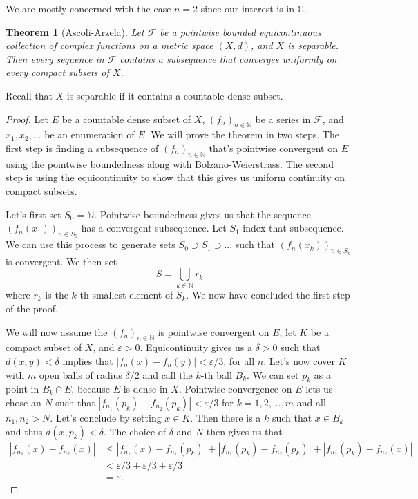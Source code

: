 \documentclass[a4paper,12pt,twoside,BCOR=10mm]{scrbook}
\newtheorem{theorem}{Theorem}[section]
\theoremstyle{definition}
\theoremstyle{definition}
\theoremstyle{definition}
\begin{document}
We are mostly concerned with the case $n = 2$ since our interest is in $\mathbb{C}$.
\begin{theorem}[Ascoli-Arzela]
Let $\mathcal{F}$ be a pointwise bounded equicontinuous collection of complex functions on a metric space $(X, d)$, and $X$ is separable.
Then every sequence in $\mathcal{F}$ contains a subsequence that converges uniformly on every compact subsets of $X$.
\end{theorem}
\label{index23}
Recall that $X$ is separable if it contains a countable dense subset.
\begin{proof}
Let $E$ be a countable dense subset of $X$,
	$(f_n)_{n \in \mathbb{N}}$ be a series in $\mathcal{F}$,
	and $x_1, x_2, ...$ be an enumeration of $E$.
We will prove the theorem in two steps.
The first step is finding a subsequence of $(f_n)_{n \in \mathbb{N}}$ that's pointwise convergent on $E$ using the pointwise boundedness along with Bolzano-Weierstrass.
The second step is using the equicontinuity to show that this gives us uniform continuity on compact subsets.

Let's first set $S_0 = \mathbb{N}$.
Pointwise boundedness gives us that the sequence $(f_n(x_1))_{n \in S_0}$ has a convergent subsequence.
Let $S_1$ index that subsequence.
We can use this process to generate sets $S_0 \supset S_1 \supset ...$ such that $(f_n(x_k))_{n \in S_k}$ is convergent.
We then set
\[
	S = \bigcup_{k \in \mathbb{N}} r_k
\]
where $r_k$ is the $k$-th smallest element of $S_k$.
We now have concluded the first step of the proof.

We will now assume the $(f_n)_{n \in \mathbb{N}}$ is pointwise convergent on $E$,
	let $K$ be a compact subset of $X$, and
	$\varepsilon > 0$.
Equicontinuity gives us a $\delta > 0$ such that $d(x, y) < \delta$ implies that $|f_n(x) - f_n(y)| < \varepsilon /3$, for all $n$.
Let's now cover $K$ with $m$ open balls of radius $\delta /2$ and call the $k$-th ball $B_k$.
We can set $p_k$ as a point in $B_k \cap E$, because $E$ is dense in $X$.
Pointwise convergence on $E$ lets us chose an $N$ such that $|f_{n_1}(p_k) - f_{n_2}(p_k)| < \varepsilon /3$ for $k = 1, 2, ..., m$ and all $n_1, n_2 > N$.
Let's conclude by setting $x \in K$.
Then there is a $k$ such that $x \in B_k$ and thus $d(x, p_k) < \delta$.
The choice of $\delta$ and $N$ then gives us that
\begin{align*}
	|f_{n_1}(x) - f_{n_2}(x)|
	& \leq |f_{n_1}(x) - f_{n_1}(p_k)| + |f_{n_1}(p_k) - f_{n_2}(p_k)| + |f_{n_2}(p_k) - f_{n_2}(x)|\\
	& < \varepsilon /3 + \varepsilon /3 + \varepsilon /3 \\
	& = \varepsilon.
\end{align*}
\end{proof}
\end{document}
